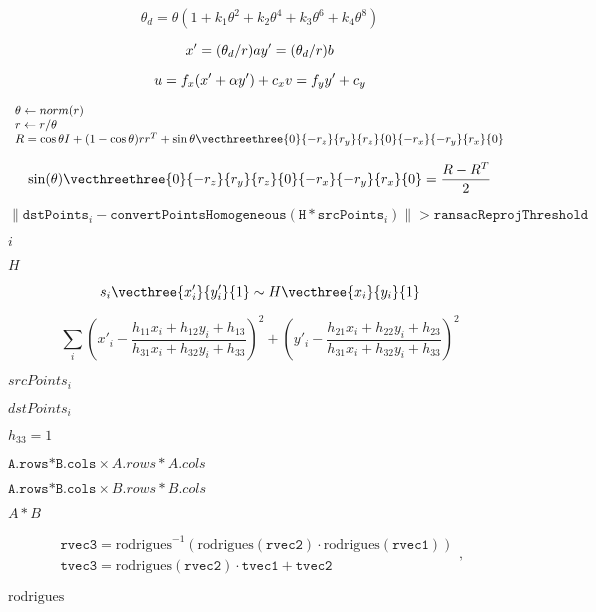\documentclass{article}
\begin{document}
\[\theta_d = \theta (1 + k_1 \theta^2 + k_2 \theta^4 + k_3 \theta^6 + k_4 \theta^8)\]
\pagebreak

\[x' = (\theta_d / r) a \\ y' = (\theta_d / r) b \]
\pagebreak

\[u = f_x (x' + \alpha y') + c_x \\ v = f_y y' + c_y\]
\pagebreak

\[\begin{array}{l} \theta \leftarrow norm(r) \\ r \leftarrow r/ \theta \\ R = \cos{\theta} I + (1- \cos{\theta} ) r r^T + \sin{\theta} \vecthreethree{0}{-r_z}{r_y}{r_z}{0}{-r_x}{-r_y}{r_x}{0} \end{array}\]
\pagebreak

\[\sin ( \theta ) \vecthreethree{0}{-r_z}{r_y}{r_z}{0}{-r_x}{-r_y}{r_x}{0} = \frac{R - R^T}{2}\]
\pagebreak

\[\| \texttt{dstPoints} _i - \texttt{convertPointsHomogeneous} ( \texttt{H} * \texttt{srcPoints} _i) \| > \texttt{ransacReprojThreshold}\]
\pagebreak

$i$
\pagebreak

$H$
\pagebreak

\[s_i \vecthree{x'_i}{y'_i}{1} \sim H \vecthree{x_i}{y_i}{1}\]
\pagebreak

\[\sum _i \left ( x'_i- \frac{h_{11} x_i + h_{12} y_i + h_{13}}{h_{31} x_i + h_{32} y_i + h_{33}} \right )^2+ \left ( y'_i- \frac{h_{21} x_i + h_{22} y_i + h_{23}}{h_{31} x_i + h_{32} y_i + h_{33}} \right )^2\]
\pagebreak

$srcPoints_i$
\pagebreak

$dstPoints_i$
\pagebreak

$h_{33}=1$
\pagebreak

$\texttt{A.rows*B.cols} \times {A.rows*A.cols}$
\pagebreak

$\texttt{A.rows*B.cols} \times {B.rows*B.cols}$
\pagebreak

$A*B$
\pagebreak

\[\begin{array}{l} \texttt{rvec3} = \mathrm{rodrigues} ^{-1} \left ( \mathrm{rodrigues} ( \texttt{rvec2} ) \cdot \mathrm{rodrigues} ( \texttt{rvec1} ) \right ) \\ \texttt{tvec3} = \mathrm{rodrigues} ( \texttt{rvec2} ) \cdot \texttt{tvec1} + \texttt{tvec2} \end{array} ,\]
\pagebreak

$\mathrm{rodrigues}$
\pagebreak
\end{document}
